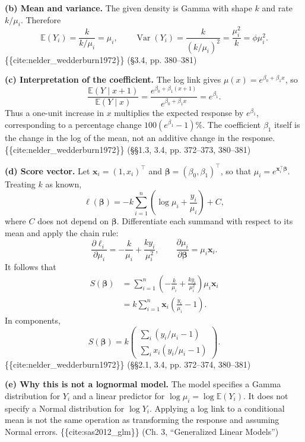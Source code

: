 \documentclass[11pt,a4paper]{article}
\newcommand{\given}{\mathrel{|}}
\newcommand{\E}{\mathbb{E}}
\begin{document}
\textbf{(b) Mean and variance.}
The given density is Gamma with shape $k$ and rate $k/\mu_i$. Therefore
\[
\boxed{\E(Y_i)=\frac{k}{k/\mu_i}=\mu_i,\qquad
\operatorname{Var}(Y_i)=\frac{k}{(k/\mu_i)^2}
=\frac{\mu_i^2}{k}=\phi\mu_i^2.}
\]
\{\{cite:nelder_wedderburn1972\}\} (§3.4, pp. 380–381)

\textbf{(c) Interpretation of the coefficient.}
The log link gives $\mu(x)=e^{\beta_0+\beta_1x}$, so
\[
\boxed{\frac{\E(Y\given x+1)}{\E(Y\given x)}
=\frac{e^{\beta_0+\beta_1(x+1)}}{e^{\beta_0+\beta_1x}}
=e^{\beta_1}.}
\]
Thus a one-unit increase in $x$ multiplies the expected response by
$e^{\beta_1}$, corresponding to a percentage change
$100(e^{\beta_1}-1)\%$. The coefficient $\beta_1$ itself is the change
in the log of the mean, not an additive change in the response.
\{\{cite:nelder_wedderburn1972\}\} (§§1.3, 3.4, pp. 372–373, 380–381)

\textbf{(d) Score vector.}
Let $\mathbf x_i=(1,x_i)^\top$ and
$\boldsymbol\beta=(\beta_0,\beta_1)^\top$, so that
$\mu_i=e^{\mathbf x_i^\top\boldsymbol\beta}$. Treating $k$ as known,
\[
\ell(\boldsymbol\beta)
=-k\sum_{i=1}^n\left(\log\mu_i+\frac{y_i}{\mu_i}\right)+C,
\]
where $C$ does not depend on $\boldsymbol\beta$. Differentiate each
summand with respect to its mean and apply the chain rule:
\[
\frac{\partial\ell_i}{\partial\mu_i}
=-\frac{k}{\mu_i}+\frac{ky_i}{\mu_i^2},
\qquad
\frac{\partial\mu_i}{\partial\boldsymbol\beta}=\mu_i\mathbf x_i.
\]
It follows that
\begin{align*}
S(\boldsymbol\beta)
&=\sum_{i=1}^n
\left(-\frac{k}{\mu_i}+\frac{ky_i}{\mu_i^2}\right)\mu_i\mathbf x_i\\
&=\boxed{k\sum_{i=1}^n\mathbf x_i\left(\frac{y_i}{\mu_i}-1\right)}.
\end{align*}
In components,
\[
S(\boldsymbol\beta)
=k\begin{pmatrix}
\sum_i(y_i/\mu_i-1)\\[3pt]
\sum_i x_i(y_i/\mu_i-1)
\end{pmatrix}.
\]
\{\{cite:nelder_wedderburn1972\}\} (§§2.1, 3.4, pp. 372–374, 380–381)

\textbf{(e) Why this is not a lognormal model.}
The model specifies a Gamma distribution for $Y_i$ and a linear predictor
for $\log\mu_i=\log\E(Y_i)$. It does not specify a Normal distribution for
$\log Y_i$. Applying a log link to a conditional mean is not the same
operation as transforming the response and assuming Normal errors.
\{\{cite:sas2012_glm\}\} (Ch. 3, “Generalized Linear Models”)
\end{document}
